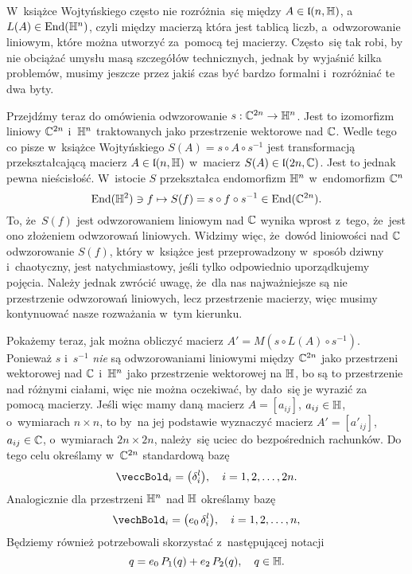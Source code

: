 \documentclass[a4paper,11pt]{article}
\numberwithin{equation}{section}
\begin{document}
W~książce Wojtyńskiego często nie rozróżnia~się między
$A \in \mathfrak{l}( n, \mathbb{H} )$, a~$L( A ) \in \mathrm{End}( \mathbb{H}^{ n } )$, czyli między
macierzą która jest tablicą liczb, a~odwzorowanie liniowym, które można
utworzyć za~pomocą tej macierzy. Często~się tak robi, by nie obciążać
umysłu masą szczegółów technicznych, jednak by wyjaśnić kilka problemów,
musimy jeszcze przez jakiś czas być bardzo formalni i~rozróżniać te dwa
byty.

Przejdźmy teraz do omówienia odwzorowanie $s : \mathbb{C}^{ 2n } \to \mathbb{H}^{ n }$.
Jest to izomorfizm liniowy $\mathbb{C}^{ 2n }$ i~$\mathbb{H}^{ n }$ traktowanych
jako przestrzenie wektorowe nad $\mathbb{C}$. Wedle tego co pisze w~książce
Wojtyńskiego $S( A ) = s \circ A \circ s^{ -1 }$ jest transformacją przekształcającą
macierz $A \in \mathfrak{l}( n, \mathbb{H} )$ w~macierz $S( A ) \in \mathfrak{l}( 2n, \mathbb{C} )$.
Jest to jednak pewna nieścisłość. W~istocie $S$ przekształca endomorfizm
$\mathbb{H}^{ n }$ w~endomorfizm $\mathbb{C}^{ n }$
\begin{equation}
  \label{eq:Wojtynski-87}
  \mathrm{End}( \mathbb{H}^{ 2 } ) \ni f \mapsto S( f ) = s \circ f \circ s^{ -1 } \in \mathrm{End}( \mathbb{C}^{ 2n } ).
\end{equation}
To, że~$S( f )$ jest odwzorowaniem liniowym nad $\mathbb{C}$ wynika wprost
z~tego, że~jest ono złożeniem odwzorowań liniowych. Widzimy więc, że~dowód
liniowości nad $\mathbb{C}$ odwzorowanie $S( f )$, który w~książce jest
przeprowadzony w~sposób dziwny i~chaotyczny, jest natychmiastowy, jeśli
tylko odpowiednio uporządkujemy pojęcia. Należy jednak zwrócić uwagę,
że~dla nas najważniejsze są nie przestrzenie odwzorowań liniowych, lecz
przestrzenie macierzy, więc musimy kontynuować nasze rozważania w~tym
kierunku.

Pokażemy teraz, jak można obliczyć macierz
$A' = M\!\left( s \circ L( A ) \circ s^{ -1 } \right)$. Ponieważ $s$ i~$s^{ -1 }$
\textit{nie} są odwzorowaniami liniowymi między $\mathbb{C}^{ 2n }$ jako
przestrzeni wektorowej nad $\mathbb{C}$ i~$\mathbb{H}^{ n }$ jako przestrzenie
wektorowej na $\mathbb{H}$, bo są to przestrzenie nad różnymi ciałami, więc nie
można oczekiwać, by dało~się je wyrazić za pomocą macierzy. Jeśli więc mamy
daną macierz $A = [ a_{ i j } ]$, $a_{ i j } \in \mathbb{H}$, o~wymiarach $n \times n$, to
by~na jej podstawie wyznaczyć macierz $A' = [ a'_{ i j } ]$,
$a_{ i j } \in \mathbb{C}$, o~wymiarach $2n \times 2n$, należy~się uciec do bezpośrednich
rachunków. Do tego celu określamy w~$\mathbb{C}^{ 2n }$ standardową bazę
\begin{equation}
  \label{eq:Wojtynski-88}
  \veccBold_{ i } = \big( \delta^{ l }_{ i } \big), \quad
  i = 1, 2, \ldots, 2n.
\end{equation}
Analogicznie dla przestrzeni $\mathbb{H}^{ n }$ nad $\mathbb{H}$ określamy bazę
\begin{equation}
  \label{eq:Wojtynski-89}
  \vechBold_{ i } = \big( e_{ 0 } \, \delta^{ l }_{ i } \big), \quad
  i = 1, 2, \ldots, n,
\end{equation}
Będziemy również potrzebowali skorzystać z~następującej notacji
\begin{equation}
  \label{eq:Wojtynski-90}
  q = e_{ 0 } \, P_{ 1 }( q ) + e_{ 2 } \, P_{ 2 }( q ), \quad
  q \in \mathbb{H}.
\end{equation}
\end{document}
